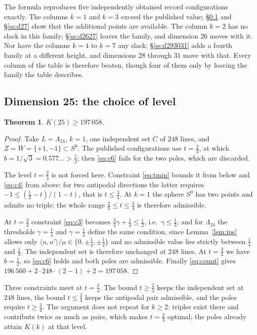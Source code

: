 \documentclass[11pt]{amsart}
\newtheorem{theorem}{Theorem}[section]
\theoremstyle{remark}
\newcommand{\Leech}{\Lambda_{24}}
\newcommand{\ip}[2]{\langle #1,#2\rangle}
\begin{document}
The formula reproduces five independently obtained record configurations exactly.
The columns $k=1$ and $k=3$ exceed the published value; \S\ref{ss:d25} and
\S\ref{ss:d27} show that the additional points are available. The column $k=2$
has no slack in this family; \S\ref{ss:d2627} leaves the family, and dimension
$26$ moves with it. Nor have the columns $k=4$ to $k=7$ any slack;
\S\ref{ss:d293031} adds a fourth family at a different height, and dimensions
$28$ through $31$ move with that. Every column of the table is therefore beaten,
though four of them only by leaving the family the table describes.

\subsection{Dimension 25: the choice of level}\label{ss:d25}

\begin{theorem}\label{thm:25}
$K(25)\ge197\,058$.
\end{theorem}

\begin{proof}
Take $L=\Leech$, $k=1$, one independent set $C$ of $248$ lines, and
$Z=W=\{+1,-1\}\subset S^{0}$. The published configurations use $t=\tfrac23$, at
which $b=1/\sqrt3=0.577\ldots>\tfrac12$; then \eqref{eq:c6} fails for the two
poles, which are discarded.

The level $t=\tfrac23$ is not forced here. Constraint \eqref{eq:tmin} bounds it
from below and \eqref{eq:c4} from above: for two antipodal directions the latter
requires $-1\le(\tfrac12-t)/(1-t)$, that is $t\le\tfrac34$. At $k=1$
the sphere $S^0$ has two points and admits no triple; the whole range
$\tfrac23\le t\le\tfrac34$ is therefore admissible.

At $t=\tfrac34$ constraint \eqref{eq:c3} becomes $\tfrac34\gamma+\tfrac14
\le\tfrac12$, i.e.\ $\gamma\le\tfrac13$; and for $\Leech$ the thresholds
$\gamma=\tfrac14$ and $\gamma=\tfrac13$ define the same condition, since
Lemma~\ref{lem:ips} allows only $\ip{u}{u'}/\mu\in\{0,\pm\tfrac14,\pm\tfrac12\}$
and no admissible value lies strictly between $\tfrac14$ and $\tfrac13$. The
independent set is therefore unchanged at $248$ lines. At $t=\tfrac34$ we have
$b=\tfrac12$, so \eqref{eq:c6} holds and both poles are admissible. Finally
\eqref{eq:count} gives
$196\,560+2\cdot248\cdot(2-1)+2=197\,058$.
\end{proof}

Three constraints meet at $t=\tfrac34$. The bound $t\ge\tfrac23$ keeps the
independent set at $248$ lines, the bound $t\le\tfrac34$ keeps the antipodal pair
admissible, and the poles require $t\ge\tfrac34$. The argument does not repeat for
$k\ge2$: triples exist there and contribute twice as much as pairs, which makes
$t=\tfrac23$ optimal; the poles already attain $K(k)$ at that level.
\end{document}
